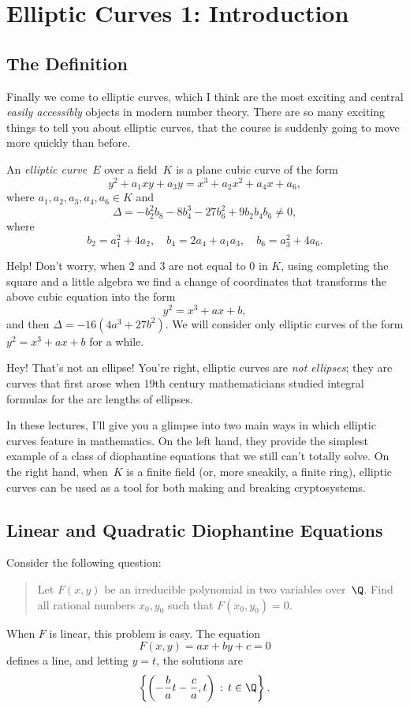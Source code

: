\documentclass[11pt]{report}
\begin{document}
\chapter{Elliptic Curves 1: Introduction}



\section{The Definition}
Finally we come to elliptic curves, which I think are the most
exciting and central {\em easily accessibly} objects in modern number
theory.   There are so many exciting things to tell you about elliptic
curves, that the course is suddenly going to move more quickly
than before.

\begin{definition}
  An {\em elliptic curve}~$E$ over a field~$K$ is a plane cubic
  curve of the form
  $$
    y^2 + a_1 xy + a_3 y = x^3 + a_2 x^2 + a_4 x + a_6,
  $$
  where
  $ a_1, a_2, a_3, a_4, a_6 \in K$
  and
  $$
    \Delta = -b_2^2 b_8 - 8b_4^3 - 27 b_6^2 + 9b_2 b_4 b_6 \neq 0,
  $$
  where
  $$b_2 = a_1^2 + 4a_2, \quad b_4 = 2a_4 + a_1 a_3,\quad
    b_6 = a_3^2 + 4a_6.
  $$
\end{definition}

Help!  Don't worry, when $2$ and $3$ are not equal to $0$ in $K$, using
completing the square and a little algebra we find a change of
coordinates that transforms the above cubic equation into the form
$$
  y^2  = x^3 + ax + b,
$$
and then $\Delta = -16(4a^3 + 27b^2)$.
We will consider only elliptic curves of the form $y^2 = x^3 + ax+b$
for a while.

Hey!  That's not an ellipse!  You're right, elliptic curves are {\em
    not ellipses}; they are curves that first arose when $19$th century
mathematicians studied integral formulas for the arc lengths of
ellipses.


In these lectures, I'll give you a glimpse into two main ways in which
elliptic curves feature in mathematics.  On the left hand, they
provide the simplest example of a class of diophantine equations that
we still can't totally solve.  On the right hand, when~$K$ is a finite
field (or, more sneakily, a finite ring), elliptic curves can be used
as a tool for both making and breaking cryptosystems.

\section{Linear and Quadratic Diophantine Equations}
Consider the following question:
\begin{quote}
  Let $F(x,y)$ be an irreducible polynomial in two variables over~$\Q$.
  Find all rational numbers $x_0,y_0$ such that
  $
    F(x_0, y_0) = 0.
  $
\end{quote}
When $F$ is linear, this problem is easy.  The equation
$$
  F(x,y) = ax + by + c = 0
$$
defines a line, and letting $y=t$, the solutions are
$$
  \left\{ \left( -\frac{b}{a} t - \frac{c}{a}, t\right)
  \, : \, t \in \Q\right\}.
$$
\end{document}
